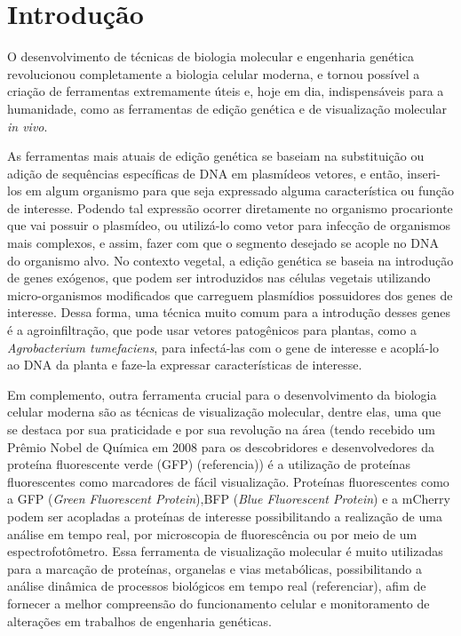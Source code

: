 \section{Introdução} 
O desenvolvimento de técnicas de biologia molecular e engenharia genética revolucionou completamente a biologia celular moderna, e tornou possível a criação de ferramentas extremamente úteis e, hoje em dia, indispensáveis para a humanidade, como as ferramentas de edição genética e de visualização molecular \textit{in vivo}.

As ferramentas mais atuais de edição genética se baseiam na substituição ou adição de sequências específicas de DNA em plasmídeos vetores, e então, inseri-los em algum organismo para que seja expressado alguma característica ou função de interesse. Podendo tal expressão ocorrer diretamente no organismo procarionte que vai possuir o plasmídeo, ou utilizá-lo como vetor para infecção de organismos mais complexos, e assim, fazer com que o segmento desejado se acople no DNA do organismo alvo. No contexto vegetal, a edição genética se baseia na introdução de genes exógenos, que podem ser introduzidos nas células vegetais utilizando micro-organismos modificados que carreguem plasmídios possuidores dos genes de interesse. Dessa forma, uma técnica muito comum para a introdução desses genes é a agroinfiltração, que pode usar vetores patogênicos para plantas, como a \textit{Agrobacterium tumefaciens}, para infectá-las com o gene de interesse e acoplá-lo ao DNA da planta e faze-la expressar características de interesse.

Em complemento, outra ferramenta crucial para o desenvolvimento da biologia celular moderna são as técnicas de visualização molecular, dentre elas, uma que se destaca por sua praticidade e por sua revolução na área (tendo recebido um Prêmio Nobel de Química em 2008 para os descobridores e desenvolvedores da proteína fluorescente verde (GFP) (referencia)) é a utilização de proteínas fluorescentes como marcadores de fácil visualização. Proteínas fluorescentes como a GFP (\textit{Green Fluorescent Protein}),BFP (\textit{Blue Fluorescent Protein}) e a mCherry podem ser acopladas a proteínas de interesse possibilitando a realização de uma análise em tempo real, por microscopia de fluorescência ou por meio de um espectrofotômetro.  Essa ferramenta de visualização molecular é muito utilizadas para a marcação de proteínas, organelas e vias metabólicas, possibilitando a análise dinâmica de processos biológicos em tempo real (referenciar), afim de fornecer a melhor compreensão do funcionamento celular e monitoramento de alterações em trabalhos de engenharia genéticas. 


